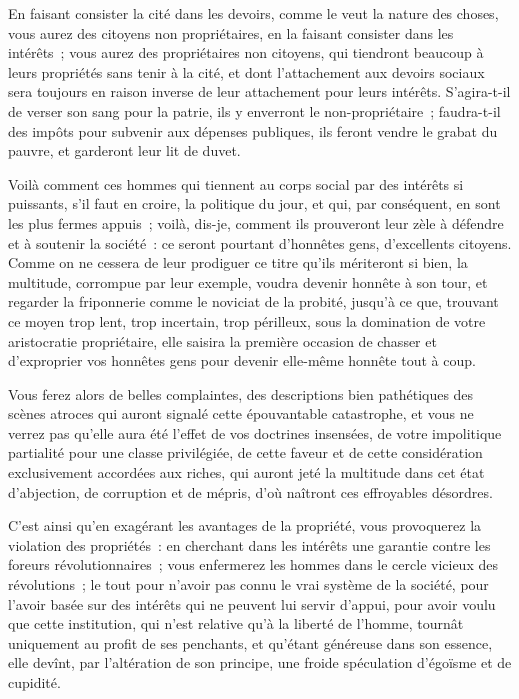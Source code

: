 \documentclass[french,twoside]{book} %
\newcommand\chapterclose{} %
\begin{document}
En faisant consister la cité dans les devoirs, comme le veut la nature des choses, vous aurez des citoyens non propriétaires, en la faisant consister dans les intérêts ; vous aurez des propriétaires non citoyens, qui tiendront beaucoup à leurs propriétés sans tenir à la cité, et dont l’attachement aux devoirs sociaux sera toujours en raison inverse de leur attachement pour leurs intérêts. S’agira-t-il de verser son sang pour la patrie, ils y enverront le non-propriétaire ; faudra-t-il des impôts pour subvenir aux dépenses publiques, ils feront vendre le grabat du pauvre, et garderont leur lit de duvet.\par
Voilà comment ces hommes qui tiennent au corps social par des intérêts si puissants, s’il faut en croire, la politique du jour, et qui, par conséquent, en sont les plus fermes appuis ; voilà, dis-je, comment ils prouveront leur zèle à défendre et à soutenir la société : ce seront pourtant d’honnêtes gens, d’excellents citoyens. Comme on ne cessera de leur prodiguer ce titre qu’ils mériteront si bien, la multitude, corrompue par leur exemple, voudra devenir honnête à son tour, et regarder la friponnerie comme le noviciat de la probité, jusqu’à ce que, trouvant ce moyen trop lent, trop incertain, trop périlleux, sous la domination de votre aristocratie propriétaire, elle saisira la première occasion de chasser et d’exproprier vos honnêtes gens pour devenir elle-même honnête tout à coup.\par
Vous ferez alors de belles complaintes, des descriptions bien pathétiques des scènes atroces qui auront signalé cette épouvantable catastrophe, et vous ne verrez pas qu’elle aura été l’effet de vos doctrines insensées, de votre impolitique partialité pour une classe privilégiée, de cette faveur et de cette considération exclusivement accordées aux riches, qui auront jeté la multitude dans cet état d’abjection, de corruption et de mépris, d’où naîtront ces effroyables désordres.\par
C’est ainsi qu’en exagérant les avantages de la propriété, vous provoquerez la violation des propriétés : en cherchant dans les intérêts une garantie contre les foreurs révolutionnaires ; vous enfermerez les hommes dans le cercle vicieux des révolutions ; le tout pour n’avoir pas connu le vrai système de la société, pour l’avoir basée sur des intérêts qui ne peuvent lui servir d’appui, pour avoir voulu que cette institution, qui n’est relative qu’à la liberté de l’homme, tournât uniquement au profit de ses penchants, et qu’étant généreuse dans son essence, elle devînt, par l’altération de son principe, une froide spéculation d’égoïsme et de cupidité.
\chapterclose
\end{document}
